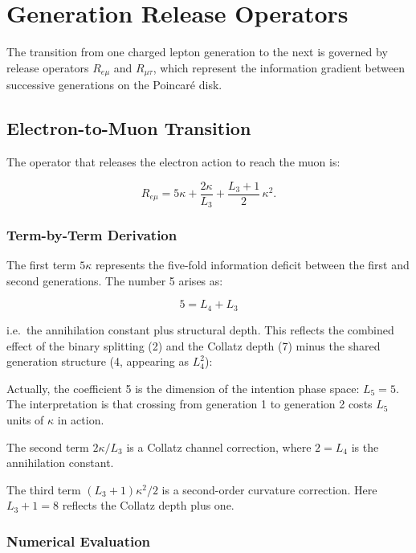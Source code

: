 \chapter{Generation Release Operators}
\label{ch:generation_release}

The transition from one charged lepton generation to the next is governed by
release operators \(R_{e\mu}\) and \(R_{\mu\tau}\), which represent the
information gradient between successive generations on the Poincar\'{e} disk.

\section{Electron-to-Muon Transition}

The operator that releases the electron action to reach the muon is:

\begin{equation}
R_{e\mu} = 5\kappa + \frac{2\kappa}{L_3} + \frac{L_3+1}{2}\,\kappa^2.
\label{eq:Rem}
\end{equation}

\subsection{Term-by-Term Derivation}

The first term \(5\kappa\) represents the five-fold information deficit
between the first and second generations.  The number 5 arises as:

\[
5 = L_4 + L_3
\]

i.e.\ the annihilation constant plus structural depth.  This reflects the
combined effect of the binary splitting (2) and the Collatz depth (7) minus
the shared generation structure (4, appearing as \(L_4^2\)):

Actually, the coefficient 5 is the dimension of the intention phase space:
\(L_5 = 5\).  The interpretation is that crossing from generation 1 to
generation 2 costs \(L_5\) units of \(\kappa\) in action.

The second term \(2\kappa/L_3\) is a Collatz channel correction,
where \(2 = L_4\) is the annihilation constant.

The third term \((L_3+1)\kappa^2/2\) is a second-order curvature correction.
Here \(L_3+1 = 8\) reflects the Collatz depth plus one.

\subsection{Numerical Evaluation}

